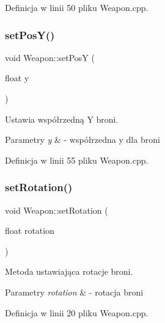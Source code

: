 Definicja w linii 50 pliku Weapon.\+cpp.

\mbox{\label{class_weapon_acd2619f9d9d417cf655d53149ee53540}} 
\subsubsection{\texorpdfstring{set\+Pos\+Y()}{setPosY()}}
{\footnotesize\ttfamily void Weapon\+::set\+PosY (\begin{DoxyParamCaption}\item[{float}]{y }\end{DoxyParamCaption})}



Ustawia współrzedną Y broni. 


\begin{DoxyParams}{Parametry}
{\em y} & -\/ współrzedna y dla broni \\
\hline
\end{DoxyParams}


Definicja w linii 55 pliku Weapon.\+cpp.

\mbox{\label{class_weapon_a057b4129e261b70f3a12703e475da353}} 
\subsubsection{\texorpdfstring{set\+Rotation()}{setRotation()}}
{\footnotesize\ttfamily void Weapon\+::set\+Rotation (\begin{DoxyParamCaption}\item[{float}]{rotation }\end{DoxyParamCaption})}



Metoda ustawiająca rotacje broni. 


\begin{DoxyParams}{Parametry}
{\em rotation} & -\/ rotacja broni \\
\hline
\end{DoxyParams}


Definicja w linii 20 pliku Weapon.\+cpp.

\mbox{\label{class_weapon_ae7f10f6f35f5b1cc4e073530841ade5d}} 
